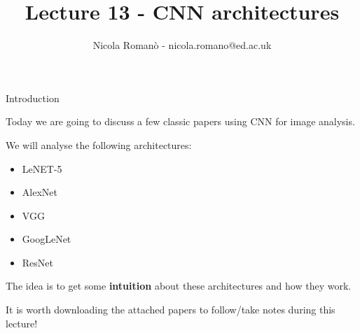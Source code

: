 \documentclass[9pt, aspectratio=169]{beamer}
\author{Nicola Roman\`o - nicola.romano@ed.ac.uk}
\title{Lecture 13 - CNN architectures}
\date{}
\begin{document}

\begin{frame}
    \titlepage
\end{frame}

\begin{frame}
    {Introduction}

    Today we are going to discuss a few classic papers using CNN for image analysis.

    We will analyse the following architectures:

    \begin{itemize}
        \item LeNET-5
        \item AlexNet
        \item VGG
        \item GoogLeNet
        \item ResNet
    \end{itemize}

    The idea is to get some \textbf{intuition} about these architectures and how they work.

    It is worth downloading the attached papers to follow/take notes during this lecture!

\end{frame}
\end{document}
